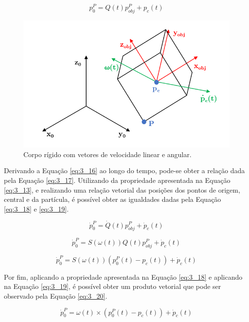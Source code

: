 \begin{equation}
p^P_0 = Q(t)p^P_{obj} + p_c(t)
\label{eq:3_16}
\end{equation}

\begin{figure}[t!]
\centering
\includegraphics[width=0.7\columnwidth]{Imagens/CorpoRig.PNG}
\caption{Corpo rígido com vetores de velocidade linear e angular.}
\label{fig:CorpoRig}
\end{figure}

Derivando a Equação \ref{eq:3_16} ao longo do tempo, pode-se obter a relação dada pela Equação \ref{eq:3_17}. Utilizando da propriedade apresentada na Equação \ref{eq:3_13}, e realizando uma relação vetorial das posições dos pontos de origem, central e da partícula, é possível obter as igualdades dadas pela Equação \ref{eq:3_18} e \ref{eq:3_19}.

\begin{equation}
\dot{p}^P_0 = \dot{Q}(t)p^P_{obj} + \dot{p}_c(t)
\label{eq:3_17}
\end{equation}

\begin{equation}
\dot{p}^P_0 = S(\omega(t))Q(t)p^P_{obj} + \dot{p}_c(t)
\label{eq:3_18}
\end{equation}

\begin{equation}
\dot{p}^P_0 = S(\omega(t))(p^P_0(t) - p_c(t)) + \dot{p}_c(t)
\label{eq:3_19}
\end{equation}

Por fim, aplicando a propriedade apresentada na Equação \ref{eq:3_18} e aplicando na Equação \ref{eq:3_19}, é possível obter um produto vetorial que pode ser observado pela Equação \ref{eq:3_20}.

\begin{equation}
\dot{p}^P_0 = \omega(t) \times (p^P_0(t) - p_c(t)) + \dot{p}_c(t)
\label{eq:3_20}
\end{equation}

